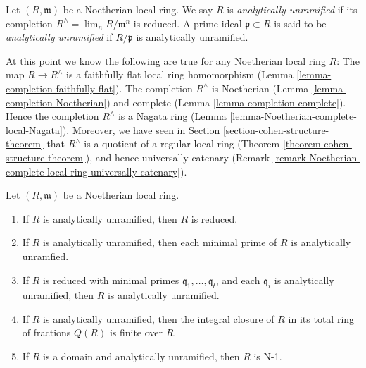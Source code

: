 \begin{definition}
\label{definition-analytically-unramified}
Let $(R, \mathfrak m)$ be a Noetherian local ring.
We say $R$ is {\it analytically unramified} if its completion
$R^\wedge = \lim_n R/\mathfrak m^n$ is reduced.
A prime ideal $\mathfrak p \subset R$ is said to be
{\it analytically unramified} if $R/\mathfrak p$ is analytically
unramified.
\end{definition}

\noindent
At this point we know
the following are true for any Noetherian local ring $R$:
The map $R \to R^\wedge$ is a faithfully flat local ring homomorphism
(Lemma \ref{lemma-completion-faithfully-flat}).
The completion $R^\wedge$ is Noetherian
(Lemma \ref{lemma-completion-Noetherian})
and complete (Lemma \ref{lemma-completion-complete}).
Hence the completion $R^\wedge$ is a Nagata ring
(Lemma \ref{lemma-Noetherian-complete-local-Nagata}).
Moreover, we have seen in Section \ref{section-cohen-structure-theorem}
that $R^\wedge$ is
a quotient of a regular local ring
(Theorem \ref{theorem-cohen-structure-theorem}), and hence
universally catenary
(Remark \ref{remark-Noetherian-complete-local-ring-universally-catenary}).

\begin{lemma}
\label{lemma-analytically-unramified-easy}
Let $(R, \mathfrak m)$ be a Noetherian local ring.
\begin{enumerate}
\item If $R$ is analytically unramified, then $R$ is reduced.
\item If $R$ is analytically unramified, then each minimal prime of
$R$ is analytically unramfied.
\item If $R$ is reduced with minimal primes
$\mathfrak q_1, \ldots, \mathfrak q_t$, and each $\mathfrak q_i$
is analytically unramified, then $R$ is analytically unramified.
\item If $R$ is analytically unramified, then the integral closure
of $R$ in its total ring of fractions $Q(R)$ is finite over $R$.
\item If $R$ is a domain and analytically unramified, then $R$ is N-1.
\end{enumerate}
\end{lemma}


